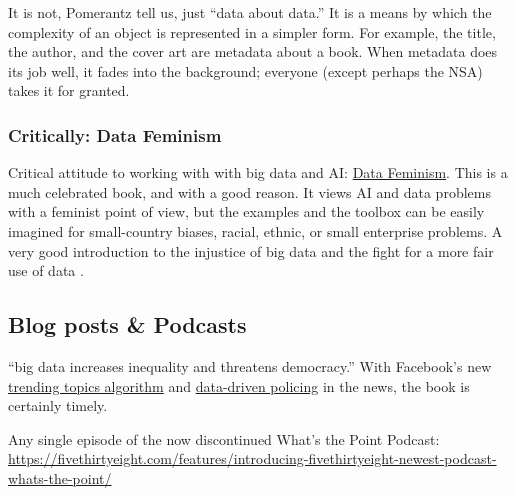 \documentclass[
  fontsize=13pt,
  english,
  a4paper,
  openany, a4paper, oneside]{book}
\begin{document}
It is not, Pomerantz tell us, just ``data about data.'' It is a means by which the complexity of an object is represented in a simpler form. For example, the title, the author, and the cover art are metadata about a book. When metadata does its job well, it fades into the background; everyone (except perhaps the NSA) takes it for granted.

\hypertarget{critically-data-feminism}{%
\subsubsection{Critically: Data Feminism}\label{critically-data-feminism}}

Critical attitude to working with with big data and AI: \href{https://mitpressonpubpub.mitpress.mit.edu/data-feminism}{Data Feminism}. This is a much celebrated book, and with a good reason. It views AI and data problems with a feminist point of view, but the examples and the toolbox can be easily imagined for small-country biases, racial, ethnic, or small enterprise problems. A very good introduction to the injustice of big data and the fight for a more fair use of data \citep{data_feminism}.

\hypertarget{blogposts}{%
\subsection{Blog posts \& Podcasts}\label{blogposts}}

``big data increases inequality and threatens democracy.'' With Facebook's new \href{http://qz.com/769413/heres-how-facebooks-automated-trending-bar-probably-works/}{trending topics algorithm} and \href{https://medium.com/equal-future/predictive-policing-is-happening-now-and-police-could-learn-a-real-lesson-from-minority-report-e105a592eda0\#.h90q9xoqx}{data-driven policing} in the news, the book is certainly timely.

Any single episode of the now discontinued What's the Point Podcast: \url{https://fivethirtyeight.com/features/introducing-fivethirtyeight-newest-podcast-whats-the-point/}
\end{document}
